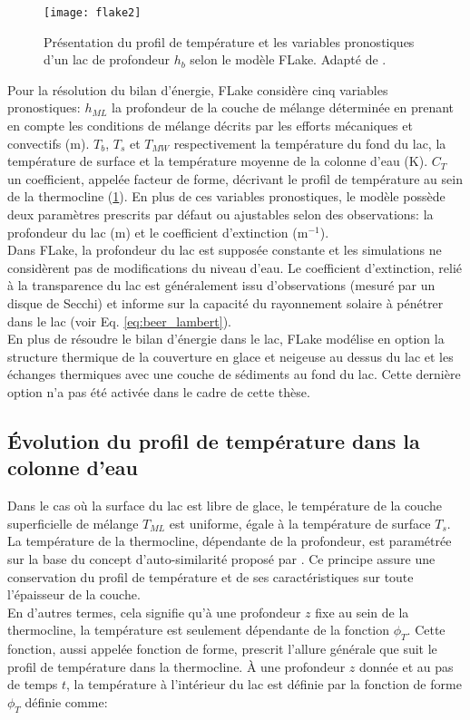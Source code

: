 \begin{figure}[h!]
  \centering
  \texttt{[image: flake2]}
  \caption{Présentation du profil de température et les variables pronostiques d'un lac de profondeur $h_{b}$ selon le modèle FLake. Adapté de \citet{mironov2008}.}
  \label{flake}
\end{figure}

\noindent Pour la résolution du bilan d'énergie, FLake considère cinq variables pronostiques: $h_{ML}$ la profondeur de la couche de mélange déterminée en prenant en compte les conditions de mélange décrits par les efforts mécaniques et convectifs (m). $T_{b}$, $T_{s}$ et $T_{MW}$ respectivement la température du fond du lac, la température de surface et la température moyenne de la colonne d'eau (K). $C_{T}$ un coefficient, appelée facteur de forme, décrivant le profil de température au sein de la thermocline (\ref{flake}). En plus de ces variables pronostiques, le modèle possède deux paramètres prescrits par défaut ou ajustables selon des observations: la profondeur du lac (m) et le coefficient d'extinction (m$^{-1}$). \\

\noindent Dans FLake, la profondeur du lac est supposée constante et les simulations ne considèrent pas de modifications du niveau d'eau. Le coefficient d'extinction, relié à la transparence du lac est généralement issu d'observations (mesuré par un disque de Secchi) et informe sur la capacité du rayonnement solaire à pénétrer dans le lac (voir Eq. \ref{eq:beer_lambert}).\\
En plus de résoudre le bilan d'énergie dans le lac, FLake modélise en option la structure thermique de la couverture en glace et neigeuse au dessus du lac et les échanges thermiques avec une couche de sédiments au fond du lac. Cette dernière option n'a pas été activée dans le cadre de cette thèse.

\subsection{{\selectfont \'Evolution du profil de température dans la colonne d'eau}}
Dans le cas où la surface du lac est libre de glace, le température de la couche superficielle de mélange $T_{ML}$ est uniforme, égale à la température de surface $T_{s}$.\\
La température de la thermocline, dépendante de la profondeur, est paramétrée sur la base du concept d'auto-similarité proposé par \citet{kitaigorodskii1970}. Ce principe assure une conservation du profil de température et de ses caractéristiques sur toute l'épaisseur de la couche. \\
En d'autres termes, cela signifie qu'à une profondeur $z$ fixe au sein de la thermocline, la température est seulement dépendante de la fonction $\phi_{T}$. Cette fonction, aussi appelée fonction de forme, prescrit l'allure générale que suit le profil de température dans la thermocline. 
À une profondeur $z$ donnée et au pas de temps $t$, la température à l'intérieur du lac est définie par la fonction de forme $\phi_{T}$ définie comme:

